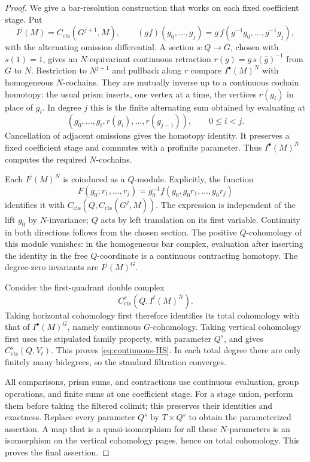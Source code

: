 \begin{proof}
We give a bar-resolution construction that works on
each fixed coefficient stage.  Put
\[
 I^j(M)=C_{\mathrm{cts}}(G^{j+1},M),\qquad
 (g f)(g_0,\ldots,g_j)
   =g\,f(g^{-1}g_0,\ldots,g^{-1}g_j),
\]
with the alternating omission differential.  A section
$s:Q\to G$, chosen with $s(1)=1$, gives an $N$-equivariant
continuous retraction
$r(g)=g\,s(\overline g)^{-1}$ from $G$ to $N$.
Restriction to $N^{j+1}$ and pullback along $r$ compare
$I^\bullet(M)^N$ with homogeneous $N$-cochains.
They are mutually inverse up to a continuous cochain
homotopy: the usual prism inserts, one vertex at a time,
the vertices $r(g_i)$ in place of $g_i$.
In degree $j$ this is the finite alternating sum obtained
by evaluating at
\[
 (g_0,\ldots,g_i,r(g_i),\ldots,r(g_{j-1})),
 \qquad 0\le i<j.
\]
Cancellation of adjacent omissions gives the homotopy
identity.  It preserves a fixed coefficient stage and
commutes with a profinite parameter.  Thus
$I^\bullet(M)^N$ computes the required $N$-cochains.

Each $I^j(M)^N$ is coinduced as a $Q$-module.  Explicitly,
the function
\[
 F(\overline g_0;r_1,\ldots,r_j)
    =g_0^{-1}f(g_0,g_0r_1,\ldots,g_0r_j)
\]
identifies it with
$C_{\mathrm{cts}}(Q,C_{\mathrm{cts}}(G^j,M))$.
The expression is independent of the lift $g_0$ by
$N$-invariance; $Q$ acts by left translation on its first
variable.  Continuity in both directions follows from
the chosen section.  The positive $Q$-cohomology of this
module vanishes: in the homogeneous bar complex,
evaluation after inserting the identity in the free
$Q$-coordinate is a continuous contracting homotopy.
The degree-zero invariants are $I^j(M)^G$.

Consider the first-quadrant double complex
\[
 C^s_{\mathrm{cts}}(Q,I^t(M)^N).
\]
Taking horizontal cohomology first therefore identifies
its total cohomology with that of $I^\bullet(M)^G$,
namely continuous $G$-cohomology.  Taking vertical
cohomology first uses the stipulated family property,
with parameter $Q^s$, and gives
$C^s_{\mathrm{cts}}(Q,V_t)$.  This proves
\eqref{eq:continuous-HS}.  In each total degree there are
only finitely many bidegrees, so the standard filtration
converges.

All comparisons, prism sums, and contractions use
continuous evaluation, group operations, and finite sums
at one coefficient stage.  For a stage union, perform
them before taking the filtered colimit; this preserves
their identities and exactness.  Replace every parameter
$Q^s$ by $T\times Q^s$ to obtain the parameterized
assertion.  A map that is a quasi-isomorphism for all
these $N$-parameters is an isomorphism on the vertical
cohomology pages, hence on total cohomology.  This proves
the final assertion.
\end{proof}

